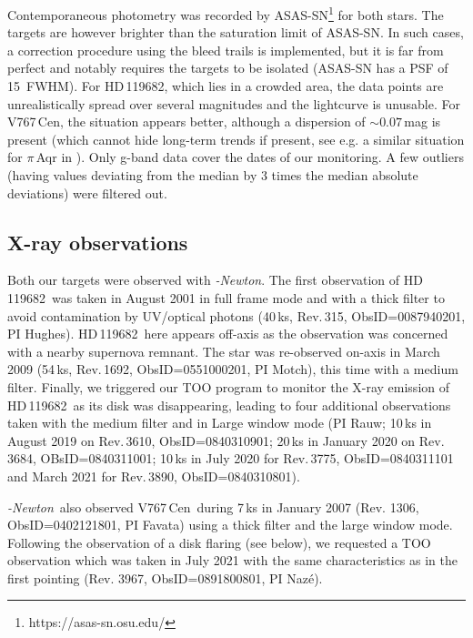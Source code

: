 \documentclass[a4paper,fleqn,usenatbib]{mnras}
\newcommand{\xmm}{{\sc{XMM}}\emph{-Newton}}
\newcommand{\hd}{HD\,119682}
\newcommand{\vc}{V767\,Cen}
\begin{document}
Contemporaneous photometry was recorded by ASAS-SN\footnote{https://asas-sn.osu.edu/} for both stars. The targets are however brighter than the saturation limit of ASAS-SN. In such cases, a correction procedure using the bleed trails is implemented, but it is far from perfect and notably requires the targets to be isolated (ASAS-SN has a PSF of 15\arcsec\ FWHM). For \hd, which lies in a crowded area, the data points are unrealistically spread over several magnitudes and the lightcurve is unusable. For \vc, the situation appears better, although a dispersion of $\sim 0.07$\,mag is present (which cannot hide long-term trends if present, see e.g. a similar situation for $\pi$\,Aqr in \citealt{naz19piaqr}). Only g-band data cover the dates of our monitoring. A few outliers (having values deviating from the median by 3 times the median absolute deviations) were filtered out.

\subsection{X-ray observations}
Both our targets were observed with \xmm. The first observation of \hd\ was taken in August 2001 in full frame mode and with a thick filter to avoid contamination by UV/optical photons (40\,ks, Rev.\,315, ObsID=0087940201, PI Hughes). \hd\ here appears off-axis as the observation was concerned with a nearby supernova remnant. The star was re-observed on-axis in March 2009 (54\,ks, Rev.\,1692, ObsID=0551000201, PI Motch), this time with a medium filter. Finally, we triggered our TOO program to monitor the X-ray emission of \hd\ as its disk was disappearing, leading to four additional observations taken with the medium filter and in Large window mode (PI Rauw; 10\,ks in August 2019 on Rev.\,3610, ObsID=0840310901; 20\,ks in January 2020 on Rev.\,3684, OBsID=0840311001; 10\,ks in July 2020 for Rev.\,3775, ObsID=0840311101 and March 2021 for Rev.\,3890, ObsID=0840310801).

\xmm\ also observed \vc\ during 7\,ks in January 2007 (Rev. 1306, ObsID=0402121801, PI Favata) using a thick filter and the large window mode. Following the observation of a disk flaring (see below), we requested a TOO observation which was taken in July 2021 with the same characteristics as in the first pointing (Rev. 3967, ObsID=0891800801, PI Naz\'e).
\end{document}
